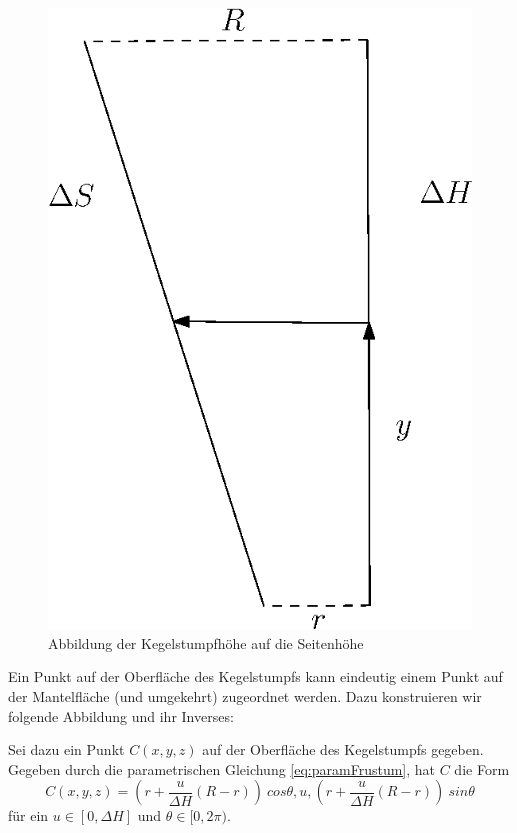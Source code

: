\begin{figure}[!htb]
	\centering
	\includegraphics[scale=.7]{images/mapToLateralS.eps}
	\caption{Abbildung der Kegelstumpfhöhe auf die Seitenhöhe}
	\label{fig:mapToLateralS}
\end{figure}

\bigskip

Ein Punkt auf der Oberfläche des Kegelstumpfs kann eindeutig einem Punkt auf der Mantelfläche (und umgekehrt) zugeordnet werden. Dazu konstruieren wir folgende Abbildung und ihr Inverses:

Sei dazu ein Punkt $C(x,y,z)$ auf der Oberfläche des Kegelstumpfs gegeben. Gegeben durch die parametrischen Gleichung \ref{eq:paramFrustum}, hat $C$ die Form
\[
C(x,y,z) = (r + \frac{u}{\Delta H} (R - r))~cos \theta, u, (r + \frac{u}{\Delta H} (R - r))~sin \theta
\]  für ein $u\in [0, \Delta H]$ und $\theta \in [0, 2\pi)$. 

